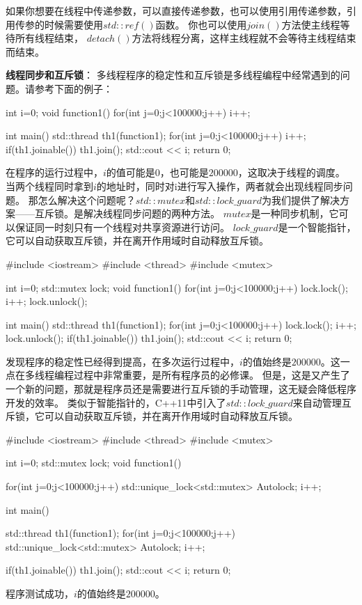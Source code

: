 如果你想要在线程中传递参数，可以直接传递参数，也可以使用引用传递参数，引用传参的时候需要使用$std::ref()$函数。
你也可以使用$join()$方法使主线程等待所有线程结束，
$detach()$方法将线程分离，这样主线程就不会等待主线程结束而结束。

\textbf{线程同步和互斥锁}：
多线程程序的稳定性和互斥锁是多线程编程中经常遇到的问题。请参考下面的例子：
\begin{tcode}
int i=0;
void function1(){
    for(int j=0;j<100000;j++)
        i++;
}

int main() {
    std::thread th1(function1);
    for(int j=0;j<100000;j++)
        i++;
    if(th1.joinable())
        th1.join();
    std::cout << i;
    return 0;
}
\end{tcode}
在程序的运行过程中，$i$的值可能是$0$，也可能是$200000$，这取决于线程的调度。
当两个线程同时拿到$i$的地址时，同时对i进行写入操作，两者就会出现线程同步问题。
那怎么解决这个问题呢？$std::mutex$和$std::lock\_guard$为我们提供了解决方案——互斥锁。是解决线程同步问题的两种方法。
$mutex$是一种同步机制，它可以保证同一时刻只有一个线程对共享资源进行访问。
$lock\_guard$是一个智能指针，它可以自动获取互斥锁，并在离开作用域时自动释放互斥锁。

\begin{tcode}
#include <iostream>
#include <thread>
#include <mutex>

int i=0;
std::mutex lock;
void function1(){
    for(int j=0;j<100000;j++){
        lock.lock();
        i++;
        lock.unlock();
    }
}

int main() {
    std::thread th1(function1);
    for(int j=0;j<100000;j++){
        lock.lock();
        i++;
        lock.unlock();
    }
    if(th1.joinable())
        th1.join();
    std::cout << i;
    return 0;
}
\end{tcode}
发现程序的稳定性已经得到提高，在多次运行过程中，$i$的值始终是$200000$。这一点在多线程编程过程中非常重要，是所有程序员的必修课。
但是，这是又产生了一个新的问题，那就是程序员还是需要进行互斥锁的手动管理，这无疑会降低程序开发的效率。
类似于智能指针的，C++11中引入了$std::lock\_guard$来自动管理互斥锁，它可以自动获取互斥锁，并在离开作用域时自动释放互斥锁。

\begin{tcode}
#include <iostream>
#include <thread>
#include <mutex>

int i=0;
std::mutex lock;
void function1(){
    for(int j=0;j<100000;j++){
        std::unique_lock<std::mutex> Autolock;
        i++;
    }

}

int main() {
    std::thread th1(function1);
    for(int j=0;j<100000;j++){
        std::unique_lock<std::mutex> Autolock;
        i++;
    }

    if(th1.joinable())
        th1.join();
    std::cout << i;
    return 0;
}
\end{tcode}
程序测试成功，$i$的值始终是$200000$。

